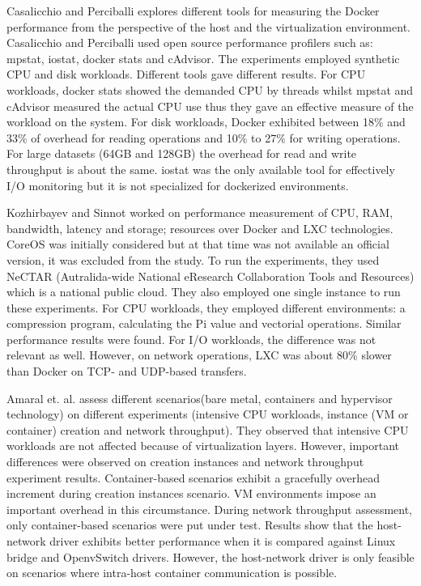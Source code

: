 Casalicchio and Perciballi \cite{casalicchio2017measuring} explores different tools for measuring the Docker performance from the perspective of the host and the virtualization environment.
Casalicchio and Perciballi used open source performance profilers such as: mpstat, iostat, docker stats and cAdvisor.
The experiments employed synthetic CPU and disk workloads.
Different tools gave different results. 
For CPU workloads, docker stats showed the demanded CPU by threads  whilst mpstat and cAdvisor measured the actual CPU use thus they gave an effective measure of the workload on the system.  
For disk workloads, Docker exhibited between 18\% and 33\% of overhead for reading operations and 10\% to 27\% for writing operations.
For large datasets (64GB and 128GB) the overhead for read and write throughput is about the same.
iostat was the only available tool for effectively I/O monitoring but it is not specialized for dockerized environments.

Kozhirbayev and Sinnot \cite{kozhirbayev2017performance} worked on performance measurement of CPU, RAM, bandwidth, latency and storage; resources over Docker and LXC technologies.
CoreOS was initially considered but at that time was not available an official version, it was excluded from the study.
To run the experiments, they used NeCTAR (Autralida-wide National eResearch Collaboration Tools and Resources) which is a national public cloud.
They also employed one single instance to run these experiments.
For CPU workloads, they employed different environments: a compression program, calculating the Pi value and vectorial operations. 
Similar performance results were found.
For I/O workloads, the difference was not relevant as well.
However, on network operations, LXC was about 80\% slower than Docker on TCP- and UDP-based transfers.

Amaral et. al. \cite{amaral2015performance} assess different scenarios(bare metal, containers and hypervisor technology) on different experiments (intensive CPU workloads, instance (VM or container) creation and network throughput).
They observed that intensive CPU workloads are not affected because of virtualization layers.
However, important differences were observed on creation instances and network throughput experiment results.
Container-based scenarios exhibit a gracefully overhead increment during creation instances scenario.
VM environments impose an important overhead in this circumstance. 
During network throughput assessment, only container-based scenarios were put under test.  
Results show that the host-network driver exhibits better performance when it is compared against Linux bridge and OpenvSwitch drivers.
However, the host-network driver is only feasible on scenarios where intra-host container communication is possible.


